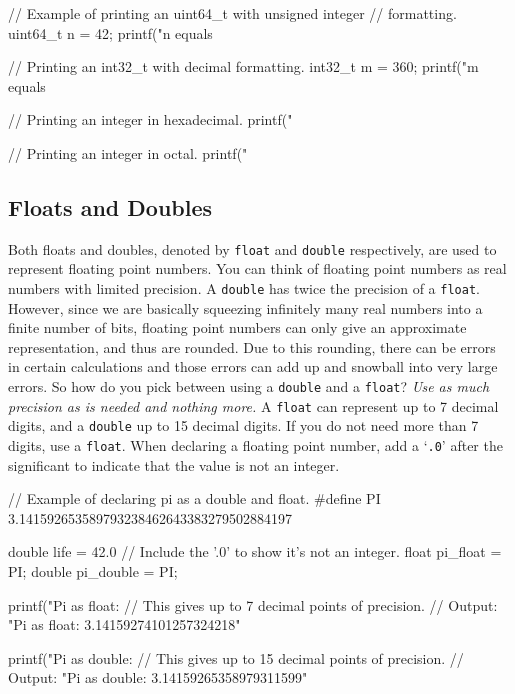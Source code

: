 \documentclass[11pt]{article}
\begin{document}
\begin{clisting}{}
// Example of printing an uint64_t with unsigned integer
// formatting.
uint64_t n = 42;
printf("n equals %

// Printing an int32_t with decimal formatting.
int32_t m = 360;
printf("m equals %

// Printing an integer in hexadecimal.
printf("%

// Printing an integer in octal.
printf("%
\end{clisting}


\subsection{Floats and Doubles}

\noindent Both floats and doubles, denoted by \texttt{float} and \texttt{double}
respectively, are used to represent floating point numbers. You can think of
floating point numbers as real numbers with limited precision. A \texttt{double}
has twice the precision of a \texttt{float}. However, since we are basically
squeezing infinitely many real numbers into a finite number of bits, floating
point numbers can only give an approximate representation, and thus are rounded.
Due to this rounding, there can be errors in certain calculations and those errors
can add up and snowball into very large errors. So how do you pick between using a \texttt{double} and a
\texttt{float}? \emph{Use as much precision as is needed and nothing more.} A
\texttt{float} can represent up to 7 decimal digits, and a \texttt{double} up to
15 decimal digits. If you do not need more than 7 digits, use a \texttt{float}.
When declaring a floating point number, add a `\texttt{.0}' after the significant to
indicate that the value is not an integer.

\begin{clisting}{}
// Example of declaring pi as a double and float.
#define PI 3.141592653589793238462643383279502884197

double life = 42.0 // Include the '.0' to show it's not an integer.
float pi_float = PI;
double pi_double = PI;

printf("Pi as float: %
// This gives up to 7 decimal points of precision.
// Output: "Pi as float: 3.14159274101257324218"

printf("Pi as double: %
// This gives up to 15 decimal points of precision.
// Output: "Pi as double: 3.14159265358979311599"
\end{clisting}
\end{document}
